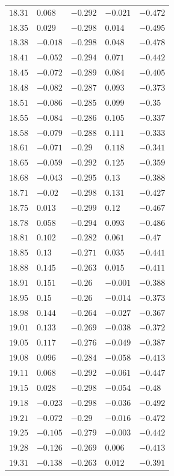 \begin{center}
\begin{longtable}{lllll}
$18.31$&$0.068$&$-0.292$&$-0.021$&$-0.472$\\
$18.35$&$0.029$&$-0.298$&$0.014$&$-0.495$\\
$18.38$&$-0.018$&$-0.298$&$0.048$&$-0.478$\\
$18.41$&$-0.052$&$-0.294$&$0.071$&$-0.442$\\
$18.45$&$-0.072$&$-0.289$&$0.084$&$-0.405$\\
$18.48$&$-0.082$&$-0.287$&$0.093$&$-0.373$\\
$18.51$&$-0.086$&$-0.285$&$0.099$&$-0.35$\\
$18.55$&$-0.084$&$-0.286$&$0.105$&$-0.337$\\
$18.58$&$-0.079$&$-0.288$&$0.111$&$-0.333$\\
$18.61$&$-0.071$&$-0.29$&$0.118$&$-0.341$\\
$18.65$&$-0.059$&$-0.292$&$0.125$&$-0.359$\\
$18.68$&$-0.043$&$-0.295$&$0.13$&$-0.388$\\
$18.71$&$-0.02$&$-0.298$&$0.131$&$-0.427$\\
$18.75$&$0.013$&$-0.299$&$0.12$&$-0.467$\\
$18.78$&$0.058$&$-0.294$&$0.093$&$-0.486$\\
$18.81$&$0.102$&$-0.282$&$0.061$&$-0.47$\\
$18.85$&$0.13$&$-0.271$&$0.035$&$-0.441$\\
$18.88$&$0.145$&$-0.263$&$0.015$&$-0.411$\\
$18.91$&$0.151$&$-0.26$&$-0.001$&$-0.388$\\
$18.95$&$0.15$&$-0.26$&$-0.014$&$-0.373$\\
$18.98$&$0.144$&$-0.264$&$-0.027$&$-0.367$\\
$19.01$&$0.133$&$-0.269$&$-0.038$&$-0.372$\\
$19.05$&$0.117$&$-0.276$&$-0.049$&$-0.387$\\
$19.08$&$0.096$&$-0.284$&$-0.058$&$-0.413$\\
$19.11$&$0.068$&$-0.292$&$-0.061$&$-0.447$\\
$19.15$&$0.028$&$-0.298$&$-0.054$&$-0.48$\\
$19.18$&$-0.023$&$-0.298$&$-0.036$&$-0.492$\\
$19.21$&$-0.072$&$-0.29$&$-0.016$&$-0.472$\\
$19.25$&$-0.105$&$-0.279$&$-0.003$&$-0.442$\\
$19.28$&$-0.126$&$-0.269$&$0.006$&$-0.413$\\
$19.31$&$-0.138$&$-0.263$&$0.012$&$-0.391$\\

\end{longtable}
\end{center}

